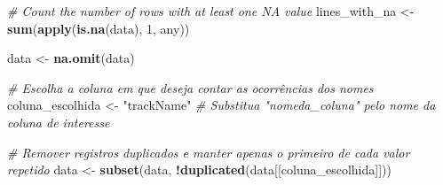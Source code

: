 \documentclass[
]{article}
\newenvironment{Shaded}{\begin{snugshade}}{\end{snugshade}}
\newcommand{\AttributeTok}[1]{\textcolor[rgb]{0.13,0.29,0.53}{#1}}
\newcommand{\CommentTok}[1]{\textcolor[rgb]{0.56,0.35,0.01}{\textit{#1}}}
\newcommand{\DecValTok}[1]{\textcolor[rgb]{0.00,0.00,0.81}{#1}}
\newcommand{\FunctionTok}[1]{\textcolor[rgb]{0.13,0.29,0.53}{\textbf{#1}}}
\newcommand{\NormalTok}[1]{#1}
\newcommand{\OtherTok}[1]{\textcolor[rgb]{0.56,0.35,0.01}{#1}}
\newcommand{\SpecialCharTok}[1]{\textcolor[rgb]{0.81,0.36,0.00}{\textbf{#1}}}
\newcommand{\StringTok}[1]{\textcolor[rgb]{0.31,0.60,0.02}{#1}}
\begin{document}
\begin{Shaded}
\begin{Highlighting}[]
\CommentTok{\# Count the number of rows with at least one NA value}
\NormalTok{lines\_with\_na }\OtherTok{\textless{}{-}} \FunctionTok{sum}\NormalTok{(}\FunctionTok{apply}\NormalTok{(}\FunctionTok{is.na}\NormalTok{(data), }\DecValTok{1}\NormalTok{, any))}
\end{Highlighting}
\end{Shaded}

\begin{Shaded}
\begin{Highlighting}[]
\NormalTok{data }\OtherTok{\textless{}{-}} \FunctionTok{na.omit}\NormalTok{(data)}
\end{Highlighting}
\end{Shaded}

\begin{Shaded}
\begin{Highlighting}[]
\CommentTok{\# Escolha a coluna em que deseja contar as ocorrências dos nomes}
\NormalTok{coluna\_escolhida }\OtherTok{\textless{}{-}} \StringTok{"trackName"}  \CommentTok{\# Substitua "nomeda\_coluna" pelo nome da coluna de interesse}

\CommentTok{\# Remover registros duplicados e manter apenas o primeiro de cada valor repetido}
\NormalTok{data }\OtherTok{\textless{}{-}} \FunctionTok{subset}\NormalTok{(data, }\SpecialCharTok{!}\FunctionTok{duplicated}\NormalTok{(data[[coluna\_escolhida]]))}
\end{Highlighting}
\end{Shaded}

\begin{Shaded}
\end{Shaded}
\end{document}
